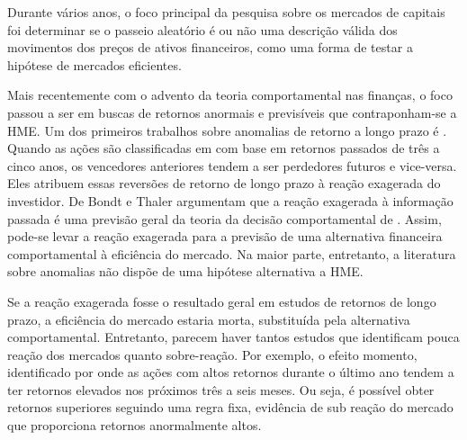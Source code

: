 Durante vários anos, o foco principal da pesquisa sobre os mercados de capitais foi determinar se o passeio aleatório é ou não uma descrição válida dos movimentos dos preços de ativos financeiros, como uma forma de testar a hipótese de mercados eficientes.

Mais recentemente com o advento da teoria comportamental nas finanças, o foco passou a ser em buscas de retornos anormais e previsíveis que contraponham-se a HME. Um dos primeiros trabalhos sobre anomalias de retorno a longo prazo é . Quando as ações são classificadas em com base em retornos passados de três a cinco anos, os vencedores anteriores tendem a ser perdedores futuros e vice-versa. Eles atribuem essas reversões de retorno de longo prazo à reação exagerada do investidor. De Bondt e Thaler argumentam que a reação exagerada à informação passada é uma previsão geral da teoria da decisão comportamental de . Assim, pode-se levar a reação exagerada para a previsão de uma alternativa financeira comportamental à eficiência do mercado. Na maior parte, entretanto, a literatura sobre anomalias não dispõe de uma hipótese alternativa a HME.

Se a reação exagerada fosse o resultado geral em estudos de retornos de longo prazo, a eficiência do mercado estaria morta, substituída pela alternativa comportamental. Entretanto, parecem haver tantos estudos que identificam pouca reação dos mercados quanto sobre-reação. Por exemplo, o efeito momento, identificado por  onde as ações com altos retornos durante o último ano tendem a ter retornos elevados nos próximos três a seis meses. Ou seja, é possível obter retornos superiores seguindo uma regra fixa, evidência de sub reação do mercado que proporciona retornos anormalmente altos.


